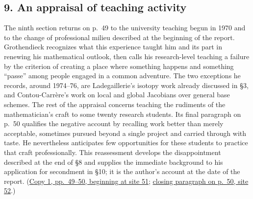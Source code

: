 \subsection*{9. An appraisal of teaching activity}
The ninth section returns on p.~49 to the university teaching begun in
1970 and to the change of professional milieu described at the beginning
of the report. Grothendieck recognizes what this experience taught him
and its part in renewing his mathematical outlook, then calls his
research-level teaching a failure by the criterion of creating a place
where something happens and something ``passe'' among people engaged in
a common adventure. The two exceptions he records, around 1974--76, are
Ladegaillerie's isotopy work already discussed in \S3, and
Contou-Carrère's work on local and global Jacobians over general base
schemes. The rest of the appraisal concerns teaching the rudiments of
the mathematician's craft to some twenty research students. Its final
paragraph on p.~50 qualifies the negative account by recalling work
better than merely acceptable, sometimes pursued beyond a single
project and carried through with taste. He nevertheless anticipates few
opportunities for these students to practice that craft professionally.
This reassessment develops the disappointment described at the end of
\S8 and supplies the immediate background to his application for
secondment in \S10; it is the author's account at the date of the report.
(\href{https://grothendieck.umontpellier.fr/web/viewer.html?file=../119.pdf\#page=52}{Copy 1, pp.~49--50, beginning at site 51};
\href{https://grothendieck.umontpellier.fr/web/viewer.html?file=../119.pdf\#page=53}{closing paragraph on p.~50, site 52}.)
